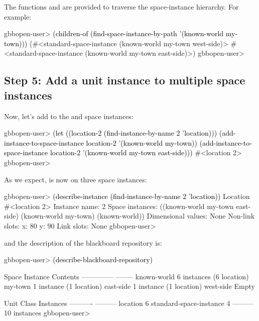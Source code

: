 \documentclass[10pt,twoside,english,pdftex]{article}
\begin{document}
%
%
The functions  and  are
provided to traverse the space-instance hierarchy.  For example:
%
\W\supp
\begin{example}
\textcolor{darkergray}{%
  gbbopen-user> \textcolor{black}{(children-of 
                  (find-space-instance-by-path '(known-world my-town)))}
  (#<standard-space-instance (known-world my-town west-side)>
   #<standard-space-instance (known-world my-town east-side)>)
  gbbopen-user>}
\end{example}

\subsection*{Step 5: Add a unit instance to multiple space instances}

%
%
Now, let's add   to the 
and  space instances:
%
\W\supp
\begin{example}
\textcolor{darkergray}{%
  gbbopen-user> \textcolor{black}{(let ((location-2 (find-instance-by-name 2 'location)))
                 (add-instance-to-space-instance location-2 '(known-world my-town))
                 (add-instance-to-space-instance location-2 '(known-world my-town east-side)))}
  #<location 2>
  gbbopen-user>}
\end{example}
%
%
%
As we expect,   is now on three space instances:
%
\W\supp\notpretop
\begin{example}
\textcolor{darkergray}{%
  gbbopen-user> \textcolor{black}{(describe-instance (find-instance-by-name 2 'location))}
  Location #<location 2>
    Instance name: 2
    Space instances: ((known-world my-town east-side)
                      (known-world my-town)
                      (known-world))
    Dimensional values: None
    Non-link slots:
      x:  80
      y:  90
    Link slots: None
  gbbopen-user>}
\end{example}
%
and the description of the blackboard repository is:
%
\W\supp\notpretop
\begin{example}
\textcolor{darkergray}{%
  gbbopen-user> \textcolor{black}{(describe-blackboard-repository)}

  Space Instance                Contents
  --------------                --------
  known-world                   6 instances (6 location)
     my-town                    1 instance (1 location)
        east-side               1 instance (1 location)
        west-side               Empty

  Unit Class                    Instances
  ----------                    ---------
  location                              6
  standard-space-instance               4
                                ---------
                                       10 instances
  gbbopen-user>}
\end{example}
\end{document}
